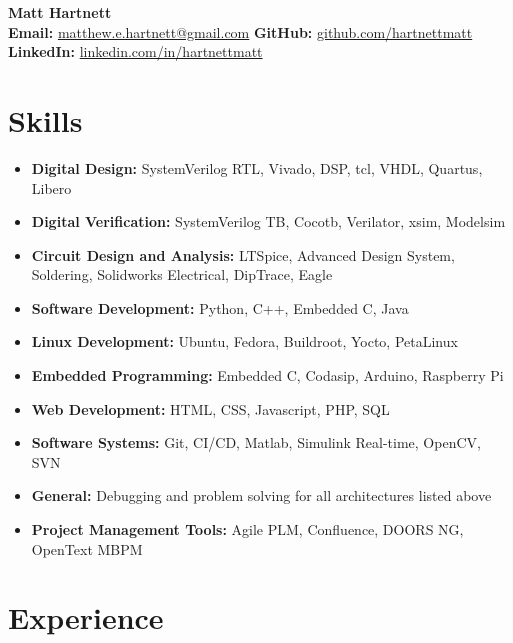 \documentclass[11pt]{article}
\begin{document}
{\LARGE \textbf{Matt Hartnett}}\\[4pt]
\textbf{Email:} \href{mailto:matthew.e.hartnett@gmail.com}{matthew.e.hartnett@gmail.com} \quad
\textbf{GitHub:} \href{https://github.com/hartnettmatt}{github.com/hartnettmatt} \quad
\textbf{LinkedIn:} \href{https://www.linkedin.com/in/hartnettmatt}{linkedin.com/in/hartnettmatt}

\section*{Skills}
\begin{itemize}[leftmargin=*]
\item \textbf{Digital Design:} SystemVerilog RTL, Vivado, DSP, tcl, VHDL, Quartus, Libero
\item \textbf{Digital Verification:} SystemVerilog TB, Cocotb, Verilator, xsim, Modelsim
\item \textbf{Circuit Design and Analysis:} LTSpice, Advanced Design System, Soldering, Solidworks Electrical, DipTrace, Eagle
\item \textbf{Software Development:} Python, C++, Embedded C, Java
\item \textbf{Linux Development:} Ubuntu, Fedora, Buildroot, Yocto, PetaLinux
\item \textbf{Embedded Programming:} Embedded C, Codasip, Arduino, Raspberry Pi
\item \textbf{Web Development:} HTML, CSS, Javascript, PHP, SQL
\item \textbf{Software Systems:} Git, CI/CD, Matlab, Simulink Real-time, OpenCV, SVN
\item \textbf{General:} Debugging and problem solving for all architectures listed above
\item \textbf{Project Management Tools:} Agile PLM, Confluence, DOORS NG, OpenText MBPM
\end{itemize}

\section*{Experience}
\end{document}
